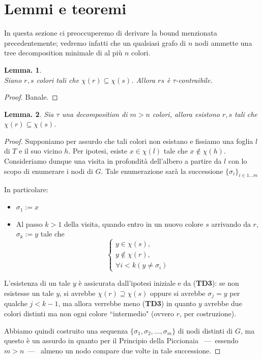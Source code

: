 \documentclass{report}
\newtheorem{lem}{Lemma.}
\begin{document}
\section{Lemmi e teoremi}
In questa sezione ci preoccuperemo di derivare la bound menzionata precedentemente; vedremo infatti che un qualsiasi grafo di $n$ nodi ammette
una tree decomposition minimale di al più $n$ colori.

\begin{lem}\ \\
Siano $r, s$ colori tali che $\chi(r) \subseteq \chi(s)$. Allora $rs$ è $\tau$-contraibile.
\end{lem}

\begin{proof} Banale.
\end{proof}
 

\begin{lem}
Sia $\tau$ una decomposition di $m > n$ colori, allora esistono $r, s$ tali che $\chi(r) \subseteq \chi(s)$.
\end{lem}

\begin{proof}
Supponiamo per assurdo che tali colori non esistano e fissiamo una foglia $l$ di $T$ e il suo vicino $h$. Per ipotesi, esiste $x \in \chi(l)$ tale che $x \notin \chi(h)$.
Consideriamo dunque una visita in profondità dell'albero a partire da $l$ con lo scopo di enumerare i nodi di $G$. Tale enumerazione sarà la successione $\{\sigma_i\}_{i \in 1\dots{}m}$

In particolare:
\begin{itemize}
	\item $\sigma_1 := x$
	\item Al passo $k>1$ della visita, quando entro in un nuovo colore $s$ arrivando da $r$, $\sigma_k := y$ tale che
						$$\begin{cases}y \in \chi(s),\\ y \notin \chi(r), \\ \forall{i<k}( y \neq \sigma_i ) \end{cases}$$
\end{itemize}
L'esistenza di un tale $y$ è assicurata dall'ipotesi iniziale e da (\textbf{TD3}): se non esistesse un tale $y$, si avrebbe $\chi(r) \supseteq \chi(s)$ oppure
si avrebbe $\sigma_j=y$ per qualche $j<k-1$, ma allora verrebbe meno (\textbf{TD3}) in quanto $y$ avrebbe due colori distinti ma non ogni colore ``intermedio" (ovvero $r$, per costruzione).

Abbiamo quindi costruito una sequenza $\{\sigma_1, \sigma_2, \dots, \sigma_m\}$ di nodi distinti di $G$, ma questo è un assurdo in quanto per il Principio della Piccionaia ~---~essendo $m>n$~---~
almeno un nodo compare due volte in tale successione.

\end{proof}
\end{document}
